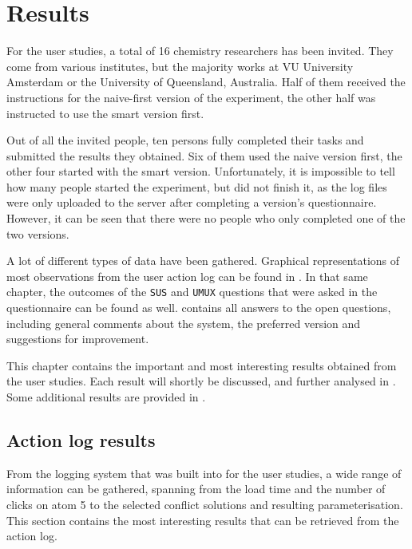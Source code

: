 \chapter{Results}

For the user studies, a total of 16 chemistry researchers has been invited. They come from various institutes, but the majority works at VU University Amsterdam or the University of Queensland, Australia. Half of them received the instructions for the naive-first version of the experiment, the other half was instructed to use the smart version first.

Out of all the invited people, ten persons fully completed their tasks and submitted the results they obtained. Six of them used the naive version first, the other four started with the smart version. Unfortunately, it is impossible to tell how many people started the experiment, but did not finish it, as the log files were only uploaded to the server after completing a version's questionnaire. However, it can be seen that there were no people who only completed one of the two versions.

A lot of different types of data have been gathered. Graphical representations of most observations from the user action log can be found in . In that same chapter, the outcomes of the \verb|SUS| and \verb|UMUX| questions that were asked in the questionnaire can be found as well.  contains all answers to the open questions, including general comments about the system, the preferred version and suggestions for improvement.

This chapter contains the important and most interesting results obtained from the user studies. Each result will shortly be discussed, and further analysed in . Some additional results are provided in .


\section{Action log results}
From the logging system that was built into \oframp{} for the user studies, a wide range of information can be gathered, spanning from the load time and the number of clicks on atom 5 to the selected conflict solutions and resulting parameterisation. This section contains the most interesting results that can be retrieved from the action log.

